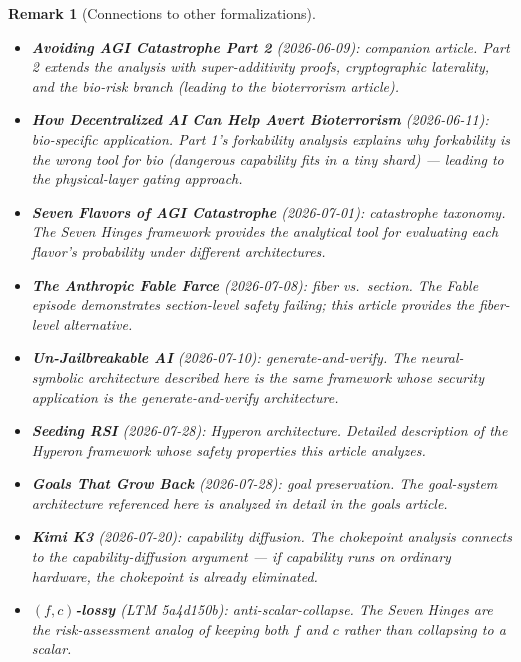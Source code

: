 \documentclass[11pt,a4paper]{article}
\newtheorem{remark}[definition]{Remark}
\begin{document}
\begin{remark}[Connections to other formalizations]
\begin{itemize}
\item \textbf{Avoiding AGI Catastrophe Part 2} (2026-06-09):
  companion article. Part 2 extends the analysis with
  super-additivity proofs, cryptographic laterality, and the
  bio-risk branch (leading to the bioterrorism article).
\item \textbf{How Decentralized AI Can Help Avert Bioterrorism}
  (2026-06-11): bio-specific application. Part 1's forkability
  analysis explains why forkability is the wrong tool for bio
  (dangerous capability fits in a tiny shard) --- leading to
  the physical-layer gating approach.
\item \textbf{Seven Flavors of AGI Catastrophe} (2026-07-01):
  catastrophe taxonomy. The Seven Hinges framework provides the
  analytical tool for evaluating each flavor's probability
  under different architectures.
\item \textbf{The Anthropic Fable Farce} (2026-07-08): fiber vs.\
  section. The Fable episode demonstrates section-level safety
  failing; this article provides the fiber-level alternative.
\item \textbf{Un-Jailbreakable AI} (2026-07-10): generate-and-verify.
  The neural-symbolic architecture described here is the same
  framework whose security application is the generate-and-verify
  architecture.
\item \textbf{Seeding RSI} (2026-07-28): Hyperon architecture.
  Detailed description of the Hyperon framework whose safety
  properties this article analyzes.
\item \textbf{Goals That Grow Back} (2026-07-28): goal preservation.
  The goal-system architecture referenced here is analyzed in
  detail in the goals article.
\item \textbf{Kimi K3} (2026-07-20): capability diffusion.
  The chokepoint analysis connects to the capability-diffusion
  argument --- if capability runs on ordinary hardware, the
  chokepoint is already eliminated.
\item \textbf{$(f,c)$-lossy} (LTM 5a4d150b): anti-scalar-collapse.
  The Seven Hinges are the risk-assessment analog of keeping
  both $f$ and $c$ rather than collapsing to a scalar.
\end{itemize}
\end{remark}
\end{document}
